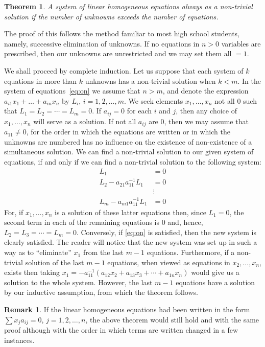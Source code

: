 \documentclass[10pt,leqno,a5paper]{book}
\newtheorem{theo}{Theorem}
\theoremstyle{definition}
\newtheorem*{rema}{Remark}
\begin{document}
\begin{theo}
\label{theo:on}
A system of linear homogeneous equations always as a non-trivial solution if the number of unknowns exceeds the number of equations.
\end{theo}


The proof of this follows the method familiar to most high school students, namely, successive elimination of unknowns.
If no equations in $n > 0$ variables are prescribed, then our unknowns are unrestricted and we may set them all $= 1$.

We shall proceed by complete induction.
Let us suppose that each system of $k$ equations in more than $k$ unknowns has a non-trivial solution when $k < m$.
In the system of equations~\eqref{eq:on} we assume that $n > m$, and denote the expression $a_{i1} x_1 + \ldots + a_{in} x_n$ by $L_i$, $i = 1,2,\ldots,m$.
We seek elements $x_1, \ldots, x_n$ not all $0$ such that $L_1 = L_2 = \cdots = L_m = 0$.
If $a_{ij} = 0$ for each $i$ and $j$, then any choice of $x_1, \ldots, x_n$ will serve as a solution.
If not all $a_{ij}$ are 0, then we may assume that $a_{11} \not= 0$, for the order in which the equations are written or in which the unknowns are numbered has no influence on the existence of non-existence of a simultaneous solution.
We can find a non-trivial solution to our given system of equations, if and only if we can find a non-trivial solution to the following system:
\begin{align*}
L_1 &= 0
\\
L_2 - a_{21} a_{11}^{-1} L_1 &= 0
\\
&\vdots
\\
L_m - a_{m1} a_{11}^{-1} L_1 &= 0
\end{align*}
For, if $x_1, \ldots, x_n$ is a solution of these latter equations then, since $L_1 = 0$, the second term in each of the remaining equations is 0 and, hence, $L_2 = L_3 = \cdots = L_m = 0$.
Conversely, if \eqref{eq:on} is satisfied, then the new system is clearly satisfied.
The reader will notice that the new system was set up in such a way as to ``eliminate'' $x_1$ from the last $m-1$ equations.
Furthermore, if a non-trivial solution of the last $m-1$ equations, when viewed as equations in $x_2, \ldots, x_n$, exists then taking $x_1 = -a_{11}^{-1}(a_{12} x_2 + a_{13} x_3 + \cdots + a_{1n} x_n)$ would give us a solution to the whole system.
However, the last $m-1$ equations have a solution by our inductive assumption, from which the theorem follows.


\begin{rema}
If the linear homogeneous equations had been written in the form $\sum x_j a_{ij} = 0$, $j = 1, 2, \ldots, n$, the above theorem would still hold and with the same proof although with the order in which terms are written changed in a few instances.
\end{rema}
\end{document}
